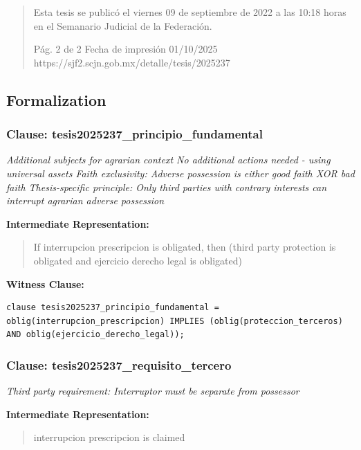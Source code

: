\documentclass[11pt,a4paper]{article}
\begin{document}
\begin{quote}
Esta tesis se publicó el viernes 09 de septiembre de 2022 a las 10:18 horas en el Semanario
Judicial de la Federación.




                                             Pág. 2 de 2            Fecha de impresión 01/10/2025
 https://sjf2.scjn.gob.mx/detalle/tesis/2025237

\end{quote}

\subsection{Formalization}

\subsubsection{Clause: tesis2025237\_principio\_fundamental}

\textit{Additional subjects for agrarian context No additional actions needed - using universal assets Faith exclusivity: Adverse possession is either good faith XOR bad faith Thesis-specific principle: Only third parties with contrary interests can interrupt agrarian adverse possession}

\textbf{Intermediate Representation:}

\begin{quote}
If interrupcion prescripcion is obligated, then (third party protection is obligated and ejercicio derecho legal is obligated)
\end{quote}

\textbf{Witness Clause:}

\begin{lstlisting}[style=witnessstyle, language=Witness]
clause tesis2025237_principio_fundamental = oblig(interrupcion_prescripcion) IMPLIES (oblig(proteccion_terceros) AND oblig(ejercicio_derecho_legal));
\end{lstlisting}

\subsubsection{Clause: tesis2025237\_requisito\_tercero}

\textit{Third party requirement: Interruptor must be separate from possessor}

\textbf{Intermediate Representation:}

\begin{quote}
interrupcion prescripcion is claimed
\end{quote}
\end{document}
